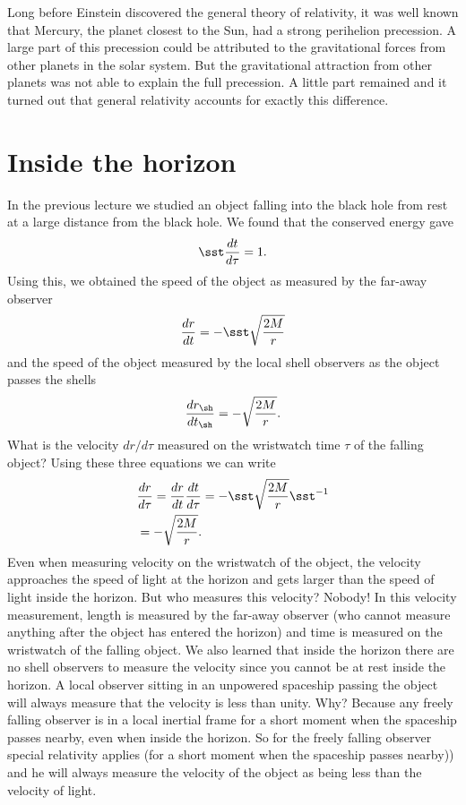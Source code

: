 {\begin{multicols}{2}
Long before Einstein discovered the general theory of relativity, it was well known that Mercury, the planet closest to the Sun, had a strong perihelion precession. A large part of this precession could be attributed to the gravitational forces from other planets in the solar system. But the gravitational attraction from other planets was not able to explain the full precession. A little part remained and it turned out that general relativity accounts for exactly this difference.

\section{Inside the horizon}

In the previous lecture we studied an object falling into the black hole from rest at a large distance from the black hole. We found that the conserved energy gave
\[
\sst\frac{dt}{d\tau}=1.
\]
Using this, we obtained the speed of the object as measured by the far-away observer
\[
\frac{dr}{dt}=-\sst\sqrt{\frac{2M}{r}}
\]
and the speed of the object measured by the local shell observers as the object passes the shells
\[
\frac{dr_\sh}{dt_\sh}=-\sqrt{\frac{2M}{r}}.
\]
What is the velocity $dr/d\tau$ measured on the wristwatch time $\tau$ of the falling object? Using these three equations we can write
\begin{align}
\label{eq:ff}
&\frac{dr}{d\tau}=\frac{dr}{dt}\frac{dt}{d\tau}=-\sst\sqrt{\frac{2M}{r}}\sst^{-1}\nonumber\\
&=-\sqrt{\frac{2M}{r}}.
\end{align}
Even when measuring velocity on the wristwatch of the object, the velocity approaches the speed of light at the horizon and gets larger than the speed of light inside the horizon. But who measures this velocity? Nobody! In this velocity measurement, length is measured by the far-away observer (who cannot measure anything after the object has entered the horizon) and time is measured on the wristwatch of the falling object. We also learned that inside the horizon there are no shell observers to measure the velocity since you cannot be at rest inside the horizon. A local observer sitting in an unpowered spaceship passing the object will always measure that the velocity is less than unity. Why? Because any freely falling observer is in a local inertial frame for a short moment when the spaceship passes nearby, even when inside the horizon. So for the freely falling observer special relativity applies (for a short moment when the spaceship passes nearby)) and he will always measure the velocity of the object as being less than the velocity of light.


\end{multicols}}

